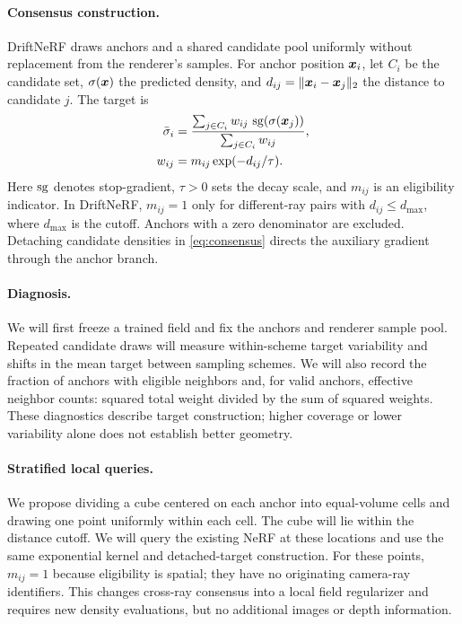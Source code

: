 \documentclass[sigconf,nonacm]{acmart}
\begin{document}
\paragraph{Consensus construction.}
DriftNeRF draws anchors and a shared candidate pool uniformly without replacement from the renderer's samples. For anchor position $\boldsymbol{x}_i$, let $C_i$ be the candidate set, $\sigma(\boldsymbol{x})$ the predicted density, and $d_{ij}=\|\boldsymbol{x}_i-\boldsymbol{x}_j\|_2$ the distance to candidate $j$. The target is
\begin{equation}
\label{eq:consensus}
\begin{aligned}
\bar\sigma_i &= \frac{\sum_{j\in C_i} w_{ij}\,\operatorname{sg}\!\left(\sigma(\boldsymbol{x}_j)\right)}{\sum_{j\in C_i}w_{ij}},\\
w_{ij} &= m_{ij}\exp(-d_{ij}/\tau).
\end{aligned}
\end{equation}
Here $\operatorname{sg}$ denotes stop-gradient, $\tau>0$ sets the decay scale, and $m_{ij}$ is an eligibility indicator. In DriftNeRF, $m_{ij}=1$ only for different-ray pairs with $d_{ij}\leq d_{\max}$, where $d_{\max}$ is the cutoff. Anchors with a zero denominator are excluded. Detaching candidate densities in \cref{eq:consensus} directs the auxiliary gradient through the anchor branch.

\paragraph{Diagnosis.}
We will first freeze a trained field and fix the anchors and renderer sample pool. Repeated candidate draws will measure within-scheme target variability and shifts in the mean target between sampling schemes. We will also record the fraction of anchors with eligible neighbors and, for valid anchors, effective neighbor counts: squared total weight divided by the sum of squared weights. These diagnostics describe target construction; higher coverage or lower variability alone does not establish better geometry.

\paragraph{Stratified local queries.}
We propose dividing a cube centered on each anchor into equal-volume cells and drawing one point uniformly within each cell. The cube will lie within the distance cutoff. We will query the existing NeRF at these locations and use the same exponential kernel and detached-target construction. For these points, $m_{ij}=1$ because eligibility is spatial; they have no originating camera-ray identifiers. This changes cross-ray consensus into a local field regularizer and requires new density evaluations, but no additional images or depth information.
\end{document}
